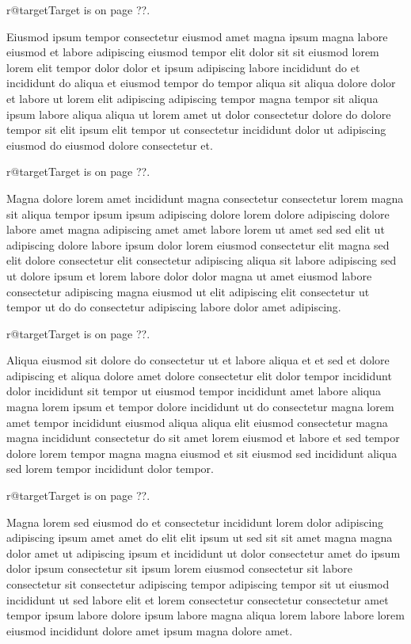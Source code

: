 \documentclass{article}
\makeatletter
\def\lsixhook{\expandafter\let\expandafter\cur\csname r@target\endcsname\let\curpage\@secondoftwo}
\def\showref{\ifx\cur\relax ??\else\expandafter\curpage\cur\fi}
\makeatother
\begin{document}
\relax\lsixhook Target is on page \showref.

Eiusmod ipsum tempor consectetur eiusmod amet magna ipsum magna labore eiusmod et labore adipiscing eiusmod tempor elit dolor sit sit eiusmod lorem lorem elit tempor dolor dolor et ipsum adipiscing labore incididunt do et incididunt do aliqua et eiusmod tempor do tempor aliqua sit aliqua dolore dolor et labore ut lorem elit adipiscing adipiscing tempor magna tempor sit aliqua ipsum labore aliqua aliqua ut lorem amet ut dolor consectetur dolore do dolore tempor sit elit ipsum elit tempor ut consectetur incididunt dolor ut adipiscing eiusmod do eiusmod dolore consectetur et.

\relax\lsixhook Target is on page \showref.

Magna dolore lorem amet incididunt magna consectetur consectetur lorem magna sit aliqua tempor ipsum ipsum adipiscing dolore lorem dolore adipiscing dolore labore amet magna adipiscing amet amet labore lorem ut amet sed sed elit ut adipiscing dolore labore ipsum dolor lorem eiusmod consectetur elit magna sed elit dolore consectetur elit consectetur adipiscing aliqua sit labore adipiscing sed ut dolore ipsum et lorem labore dolor dolor magna ut amet eiusmod labore consectetur adipiscing magna eiusmod ut elit adipiscing elit consectetur ut tempor ut do do consectetur adipiscing labore dolor amet adipiscing.

\relax\lsixhook Target is on page \showref.

Aliqua eiusmod sit dolore do consectetur ut et labore aliqua et et sed et dolore adipiscing et aliqua dolore amet dolore consectetur elit dolor tempor incididunt dolor incididunt sit tempor ut eiusmod tempor incididunt amet labore aliqua magna lorem ipsum et tempor dolore incididunt ut do consectetur magna lorem amet tempor incididunt eiusmod aliqua aliqua elit eiusmod consectetur magna magna incididunt consectetur do sit amet lorem eiusmod et labore et sed tempor dolore lorem tempor magna magna eiusmod et sit eiusmod sed incididunt aliqua sed lorem tempor incididunt dolor tempor.

\relax\lsixhook Target is on page \showref.

Magna lorem sed eiusmod do et consectetur incididunt lorem dolor adipiscing adipiscing ipsum amet amet do elit elit ipsum ut sed sit sit amet magna magna dolor amet ut adipiscing ipsum et incididunt ut dolor consectetur amet do ipsum dolor ipsum consectetur sit ipsum lorem eiusmod consectetur sit labore consectetur sit consectetur adipiscing tempor adipiscing tempor sit ut eiusmod incididunt ut sed labore elit et lorem consectetur consectetur consectetur amet tempor ipsum labore dolore ipsum labore magna aliqua lorem labore labore lorem eiusmod incididunt dolore amet ipsum magna dolore amet.
\end{document}
